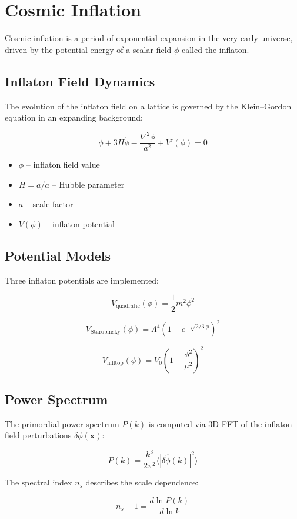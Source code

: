 \section{Cosmic Inflation}

Cosmic inflation is a period of exponential expansion in the very early universe, driven by the potential energy of a scalar field $\phi$ called the inflaton.

\subsection{Inflaton Field Dynamics}

The evolution of the inflaton field on a lattice is governed by the Klein--Gordon equation in an expanding background:

\begin{equation}
\ddot{\phi} + 3H\dot{\phi} - \frac{\nabla^2 \phi}{a^2} + V'(\phi) = 0
\end{equation}

\begin{itemize}
\item $\phi$ -- inflaton field value
\item $H = \dot{a}/a$ -- Hubble parameter
\item $a$ -- scale factor
\item $V(\phi)$ -- inflaton potential
\end{itemize}

\subsection{Potential Models}

Three inflaton potentials are implemented:

\begin{equation}
V_{\text{quadratic}}(\phi) = \frac{1}{2} m^2 \phi^2
\end{equation}

\begin{equation}
V_{\text{Starobinsky}}(\phi) = \Lambda^4 \left(1 - e^{-\sqrt{2/3}\,\phi}\right)^2
\end{equation}

\begin{equation}
V_{\text{hilltop}}(\phi) = V_0 \left(1 - \frac{\phi^2}{\mu^2}\right)^2
\end{equation}

\subsection{Power Spectrum}

The primordial power spectrum $P(k)$ is computed via 3D FFT of the inflaton field perturbations $\delta\phi(\mathbf{x})$:

\begin{equation}
P(k) = \frac{k^3}{2\pi^2} \langle |\delta\hat{\phi}(k)|^2 \rangle
\end{equation}

The spectral index $n_s$ describes the scale dependence:

\begin{equation}
n_s - 1 = \frac{d \ln P(k)}{d \ln k}
\end{equation}
